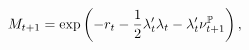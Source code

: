 \begin{equation} \label{eq:nSDF}
	M_{t+1} = \exp\left( -r_{t} -\frac{1}{2} \lambda_{t}'\lambda_{t} - \lambda_{t}'\nu_{t+1}^{\mathbb{P}} \right) ,
\end{equation}